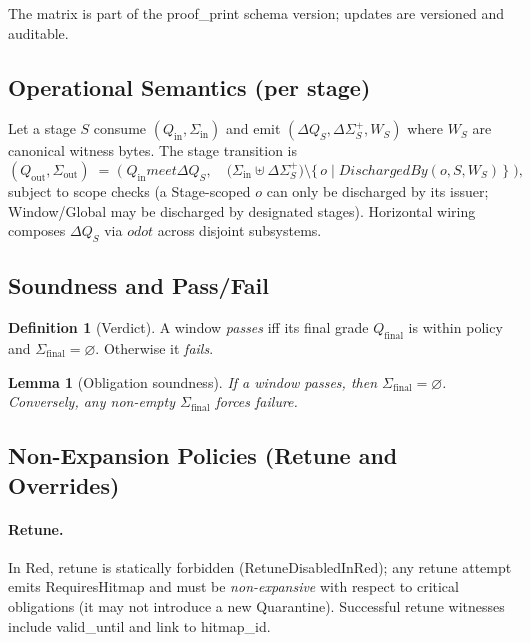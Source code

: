 \documentclass[11pt]{article}
\theoremstyle{plain}
\newtheorem{lemma}[theorem]{Lemma}
\theoremstyle{definition}
\newtheorem{definition}[theorem]{Definition}
\theoremstyle{remark}
\def\Q{Q}%
\def\vmeet{meet}%
\def\hplus{odot}%
\def\code#1{#1}%
\DeclareRobustCommand{\Q}{\texorpdfstring{\ensuremath{\mathcal{Q}}}{Q}}     %
\newcommand{\vmeet}{\wedge}                    %
\newcommand{\hplus}{\odot}                     %
\newcommand{\code}[1]{\texttt{\textup{#1}}}    %
\def\Q{Q}%
\def\vmeet{meet}%
\def\hplus{odot}%
\def\code#1{#1}%
\begin{document}
\noindent
The matrix is part of the \code{proof\_print} schema version; updates are versioned and auditable.

\subsection{Operational Semantics (per stage)}
Let a stage $S$ consume $(\Q_{\text{in}}, \Sigma_{\text{in}})$ and emit $(\Delta\Q_S, \Delta\Sigma^{+}_S, W_S)$ where $W_S$ are canonical witness bytes. The stage transition is
\[
(\Q_{\text{out}}, \Sigma_{\text{out}}) \;=\;
\Big(\;\Q_{\text{in}} \vmeet \Delta\Q_S,\quad
\big(\Sigma_{\text{in}} \uplus \Delta\Sigma^{+}_S\big) \setminus \{\,o \mid \code{DischargedBy}(o,S,W_S)\,\}\;\Big),
\]
subject to scope checks (a Stage-scoped $o$ can only be discharged by its issuer; Window/Global may be discharged by designated stages). Horizontal wiring composes $\Delta\Q_S$ via $\hplus$ across disjoint subsystems.

\subsection{Soundness and Pass/Fail}
\begin{definition}[Verdict] \label{def:verdict}
A window \emph{passes} iff its final grade $\Q_{\mathrm{final}}$ is within policy and $\Sigma_{\mathrm{final}}=\varnothing$. Otherwise it \emph{fails}.
\end{definition}

\begin{lemma}[Obligation soundness]\label{lem:soundness}
If a window passes, then $\Sigma_{\mathrm{final}}=\varnothing$. Conversely, any non-empty $\Sigma_{\mathrm{final}}$ forces failure.
\end{lemma}

\subsection{Non-Expansion Policies (Retune and Overrides)}
\paragraph{Retune.} In Red, retune is statically forbidden (\code{RetuneDisabledInRed}); any retune attempt emits \code{RequiresHitmap} and must be \emph{non-expansive} with respect to critical obligations (it may not introduce a new \code{Quarantine}). Successful retune witnesses include \code{valid\_until} and link to \code{hitmap\_id}.
\end{document}
